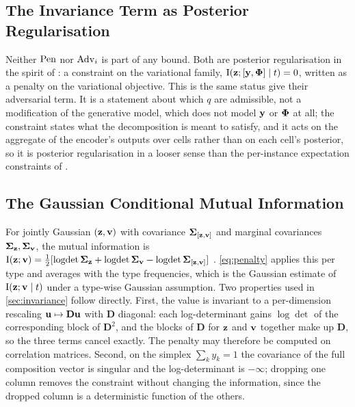\subsection{The Invariance Term as Posterior Regularisation}
\label{app:posterior-reg}

 Neither $\mathrm{Pen}$ nor $\mathrm{Adv}_i$ is part of any bound. Both are posterior regularisation in the spirit of \citet{ganchev2010}: a constraint on the variational family, $\operatorname{I}(\mathbf{z}; [\mathbf{y}, \boldsymbol{\Phi}] \mid t) = 0$, written as a penalty on the variational objective. This is the same status \citet{slavutsky2025} give their adversarial term. It is a statement about which $q$ are admissible, not a modification of the generative model, which does not model $\mathbf{y}$ or $\boldsymbol{\Phi}$ at all; the constraint states what the decomposition is meant to satisfy, and it acts on the aggregate of the encoder's outputs over cells rather than on each cell's posterior, so it is posterior regularisation in a looser sense than the per-instance expectation constraints of \citet{ganchev2010}.

\subsection{The Gaussian Conditional Mutual Information}
\label{app:gaussian-mi}

For jointly Gaussian $(\mathbf{z}, \mathbf{v})$ with covariance $\boldsymbol{\Sigma}_{[\mathbf{z},\mathbf{v}]}$ and marginal covariances $\boldsymbol{\Sigma}_{\mathbf{z}}, \boldsymbol{\Sigma}_{\mathbf{v}}$, the mutual information is $\operatorname{I}(\mathbf{z};\mathbf{v}) = \tfrac12[\operatorname{logdet}\boldsymbol{\Sigma}_{\mathbf{z}} + \operatorname{logdet}\boldsymbol{\Sigma}_{\mathbf{v}} - \operatorname{logdet}\boldsymbol{\Sigma}_{[\mathbf{z},\mathbf{v}]}]$ \citep{cover2006}. \cref{eq:penalty} applies this per type and averages with the type frequencies, which is the Gaussian estimate of $\operatorname{I}(\mathbf{z};\mathbf{v} \mid t)$ under a type-wise Gaussian assumption. Two properties used in \cref{sec:invariance} follow directly. First, the value is invariant to a per-dimension rescaling $\mathbf{u} \mapsto \mathbf{D}\mathbf{u}$ with $\mathbf{D}$ diagonal: each log-determinant gains $\log\det$ of the corresponding block of $\mathbf{D}^2$, and the blocks of $\mathbf{D}$ for $\mathbf{z}$ and $\mathbf{v}$ together make up $\mathbf{D}$, so the three terms cancel exactly. The penalty may therefore be computed on correlation matrices. Second, on the simplex $\sum_k y_k = 1$ the covariance of the full composition vector is singular and the log-determinant is $-\infty$; dropping one column removes the constraint without changing the information, since the dropped column is a deterministic function of the others.

